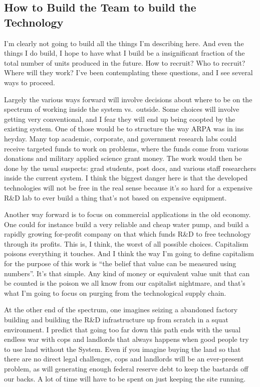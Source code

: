 \subsection{How to Build the Team to build the
Technology}\label{how-to-build-the-team-to-build-the-technology}

I'm clearly not going to build all the things I'm describing here. And
even the things I do build, I hope to have what I build be a
insignificant fraction of the total number of units produced in the
future. How to recruit? Who to recruit? Where will they work? I've been
contemplating these questions, and I see several ways to proceed.

Largely the various ways forward will involve decisions about where to
be on the spectrum of working inside the system vs.~outside. Some
choices will involve getting very conventional, and I fear they will end
up being coopted by the existing system. One of those would be to
structure the way ARPA was in ins heyday. Many top academic, corporate,
and government research labs could receive targeted funds to work on
problems, where the funds come from various donations and military
applied science grant money. The work would then be done by the usual
suspects: grad students, post docs, and various staff researchers inside
the current system. I think the biggest danger here is that the
developed technologies will not be free in the real sense because it's
so hard for a expensive R\&D lab to ever build a thing that's not based
on expensive equipment.

Another way forward is to focus on commercial applications in the old
economy. One could for instance build a very reliable and cheap water
pump, and build a rapidly growing for-profit company on that which funds
R\&D to free technology through its profits. This is, I think, the worst
of all possible choices. Capitalism poisons everything it touches. And I
think the way I'm going to define capitalism for the purpose of this
work is ``the belief that value can be measured using numbers''. It's
that simple. Any kind of money or equivalent value unit that can be
counted is the poison we all know from our capitalist nightmare, and
that's what I'm going to focus on purging from the technological supply
chain.

At the other end of the spectrum, one imagines seizing a abandoned
factory building and building the R\&D infrastructure up from scratch in
a squat environment. I predict that going too far down this path ends
with the usual endless war with cops and landlords that always happens
when good people try to use land without the System. Even if you imagine
buying the land so that there are no direct legal challenges, cops and
landlords will be an ever-present problem, as will generating enough
federal reserve debt to keep the bastards off our backs. A lot of time
will have to be spent on just keeping the site running.

